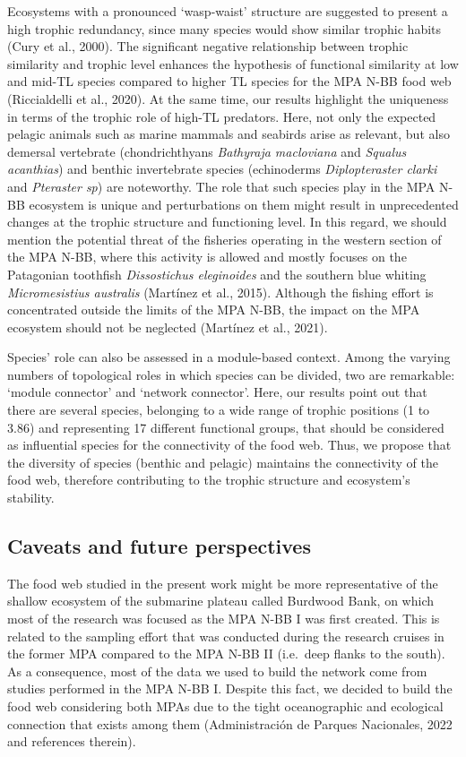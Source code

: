 \documentclass[preprint, 3p,
authoryear]{elsarticle} %
\begin{document}
Ecosystems with a pronounced `wasp-waist' structure are suggested to
present a high trophic redundancy, since many species would show similar
trophic habits (Cury et al., 2000). The significant negative
relationship between trophic similarity and trophic level enhances the
hypothesis of functional similarity at low and mid-TL species compared
to higher TL species for the MPA N-BB food web (Riccialdelli et al.,
2020). At the same time, our results highlight the uniqueness in terms
of the trophic role of high-TL predators. Here, not only the expected
pelagic animals such as marine mammals and seabirds arise as relevant,
but also demersal vertebrate (chondrichthyans \emph{Bathyraja
macloviana} and \emph{Squalus acanthias}) and benthic invertebrate
species (echinoderms \emph{Diplopteraster clarki} and \emph{Pteraster
sp}) are noteworthy. The role that such species play in the MPA N-BB
ecosystem is unique and perturbations on them might result in
unprecedented changes at the trophic structure and functioning level. In
this regard, we should mention the potential threat of the fisheries
operating in the western section of the MPA N-BB, where this activity is
allowed and mostly focuses on the Patagonian toothfish
\emph{Dissostichus eleginoides} and the southern blue whiting
\emph{Micromesistius australis} (Martínez et al., 2015). Although the
fishing effort is concentrated outside the limits of the MPA N-BB, the
impact on the MPA ecosystem should not be neglected (Martínez et al.,
2021).

Species' role can also be assessed in a module-based context. Among the
varying numbers of topological roles in which species can be divided,
two are remarkable: `module connector' and `network connector'. Here,
our results point out that there are several species, belonging to a
wide range of trophic positions (1 to 3.86) and representing 17
different functional groups, that should be considered as influential
species for the connectivity of the food web. Thus, we propose that the
diversity of species (benthic and pelagic) maintains the connectivity of
the food web, therefore contributing to the trophic structure and
ecosystem's stability.

\hypertarget{caveats-and-future-perspectives}{%
\subsection{Caveats and future
perspectives}\label{caveats-and-future-perspectives}}

The food web studied in the present work might be more representative of
the shallow ecosystem of the submarine plateau called Burdwood Bank, on
which most of the research was focused as the MPA N-BB I was first
created. This is related to the sampling effort that was conducted
during the research cruises in the former MPA compared to the MPA N-BB
II (i.e.~deep flanks to the south). As a consequence, most of the data
we used to build the network come from studies performed in the MPA N-BB
I. Despite this fact, we decided to build the food web considering both
MPAs due to the tight oceanographic and ecological connection that
exists among them (Administración de Parques Nacionales, 2022 and
references therein).
\end{document}
